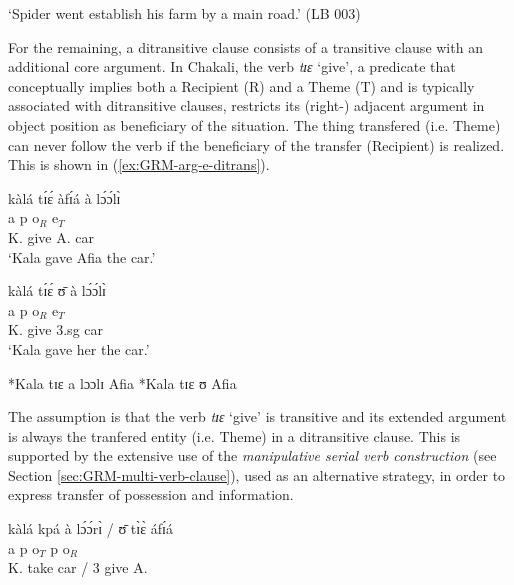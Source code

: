 \glt  `Spider went establish his farm by a main road.' (LB 003)

\z

For the remaining, a ditransitive clause consists of a transitive clause with an
additional core argument.  In Chakali, the verb {\it tɪɛ} `give', a predicate 
that conceptually implies both a Recipient (R)  and a Theme (T) and is typically
associated with ditransitive clauses, restricts its (right-) adjacent argument
in object position as  beneficiary of the situation. The thing transfered
(i.e. Theme) can never follow the verb if the beneficiary of the transfer
(Recipient) is realized. This is shown in (\ref{ex:GRM-arg-e-ditrans}).

\ea\label{ex:GRM-arg-e-ditrans}

 \ea\label{ex:GRM-arg-e-ditrans-ben-the-1}
\glll kàlá tɪ́ɛ́ àfɪ́á {à lɔ́ɔ́lɪ̀} \\
{\sc a} {\sc p} {\sc o}$_{R}$ {\sc e}$_{T}$\\
K. give A.  {{\art} car}\\

\glt  `Kala gave Afia the car.' 

 \ex\label{ex:GRM-arg-e-ditrans-ben-the-2}
\glll  kàlá tɪ́ɛ́ ʊ̄  {à lɔ́ɔ́lɪ̀} \\
{\sc a} {\sc p} {\sc o}$_{R}$ {\sc e}$_{T}$\\
K. give {\sc 3.sg}  {{\art} car}\\

  `Kala gave her  the car.' 

 \ex\label{ex:GRM-arg-e-ditrans-the-ben-1}
 *Kala tɪɛ a lɔɔlɪ Afia 
 \ex\label{ex:GRM-arg-e-ditrans-the-ben-2}
*Kala tɪɛ ʊ Afia 

\z 
 \z

The assumption is that the verb {\it tɪɛ} `give'  is transitive and its
extended argument is always the tranfered entity (i.e.
Theme) in a ditransitive clause. This is supported by the extensive use of the 
{\it manipulative serial verb construction} (see Section
\ref{sec:GRM-multi-verb-clause}), used as an alternative strategy,  in order to
express transfer of
possession  and information.



\ea\label{ex:GRM-m-svc-give}
\glll  kàlá kpá  {à lɔ́ɔ́rɪ̀ / ʊ̄} tɪ̀ɛ̀ áfɪ́á  \\
{\sc a} {\sc p} {\sc o}$_{T}$  {\sc p}  {\sc o}$_{R}$ \\
K. take  {{\art} car / 3\sg} give A.\\


